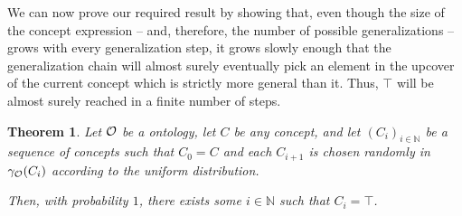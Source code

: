 \documentclass[
]{ceurart}
\newtheorem{theorem}{Theorem}
\begin{document}
\noindent We can now prove our required result by showing that, even though the size of the concept expression -- and, therefore, the number of possible generalizations -- grows with every generalization step, it grows slowly enough that the generalization chain will almost surely eventually pick an element in the upcover of the current concept which is strictly more general than it. Thus, $\top$ will be almost surely reached in a finite number of steps. 
\begin{theorem}
Let $\mathcal{O}$ be a \SROIQ ontology, let $C$ be any \SROIQ concept, and let $(C_i)_{i \in \mathbb N}$ be a sequence of concepts such that $C_0 = C$ and each $C_{i+1}$ is chosen randomly in $\gamma_\mathcal{O}(C_i)$ according to the uniform distribution. 

Then, with probability $1$, there exists some $i \in \mathbb N$ such that $C_i = \top$. 
\end{theorem}
\end{document}
